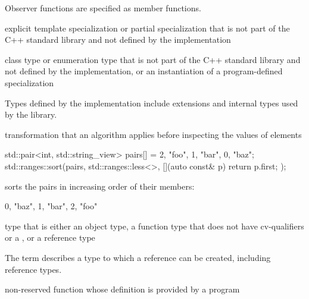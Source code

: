 \begin{defnote}
Observer functions are specified as
member functions.
\end{defnote}

%
explicit template specialization or partial specialization
that is not part of the C++ standard library and
not defined by the implementation

%
class type or enumeration type
that is not part of the C++ standard library and
not defined by the implementation,
or an instantiation of a program-defined specialization

\begin{defnote}
Types defined by the implementation include
extensions and internal types used by the library.
\end{defnote}

%
 transformation that
an algorithm applies before inspecting the values of elements

\begin{example}
\begin{codeblock}
std::pair<int, std::string_view> pairs[] = {{2, "foo"}, {1, "bar"}, {0, "baz"}};
std::ranges::sort(pairs, std::ranges::less<>{}, [](auto const& p) { return p.first; });
\end{codeblock}
sorts the pairs in increasing order of their  members:
\begin{codeblock}
{{0, "baz"}, {1, "bar"}, {2, "foo"}}
\end{codeblock}
\end{example}

%
type that is either an
object type, a function type that does not have cv-qualifiers or a
, or a reference type

\begin{defnote}
The term describes a type to which a reference can be created,
including reference types.
\end{defnote}

%
non-reserved function
whose definition is provided by a \Cpp{} program

